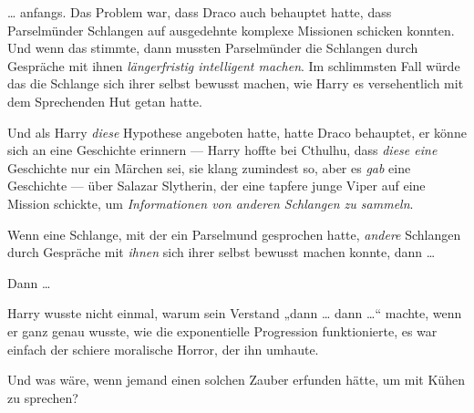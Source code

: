 … anfangs. Das Problem war, dass Draco auch behauptet hatte, dass Parselmünder Schlangen auf ausgedehnte komplexe Missionen schicken konnten. Und wenn das stimmte, dann mussten Parselmünder die Schlangen durch Gespräche mit ihnen \emph{längerfristig intelligent machen}. Im schlimmsten Fall würde das die Schlange sich ihrer selbst bewusst machen, wie Harry es versehentlich mit dem Sprechenden Hut getan hatte.

Und als Harry \emph{diese} Hypothese angeboten hatte, hatte Draco behauptet, er könne sich an eine Geschichte erinnern — Harry hoffte bei Cthulhu, dass \emph{diese eine} Geschichte nur ein Märchen sei, sie klang zumindest so, aber es \emph{gab} eine Geschichte — über Salazar Slytherin, der eine tapfere junge Viper auf eine Mission schickte, um \emph{Informationen von anderen Schlangen zu sammeln}.

Wenn eine Schlange, mit der ein Parselmund gesprochen hatte, \emph{andere} Schlangen durch Gespräche mit \emph{ihnen} sich ihrer selbst bewusst machen konnte, dann …

Dann …

Harry wusste nicht einmal, warum sein Verstand „dann … dann …“ machte, wenn er ganz genau wusste, wie die exponentielle Progression funktionierte, es war einfach der schiere moralische Horror, der ihn umhaute.

Und was wäre, wenn jemand einen solchen Zauber erfunden hätte, um mit Kühen zu sprechen?

